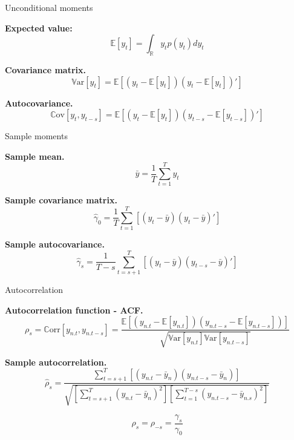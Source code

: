 \documentclass[notes,blackandwhite,mathsans]{beamer}
\begin{document}
\begin{frame}{Unconditional moments}


\textbf{Expected value:}
$$ \mathbb{E}[y_{t}] = \int_{\mathbb{R}}y_tp(y_t)dy_t $$


\textbf{Covariance matrix.}
$$ \mathbb{V}\text{ar}[y_{t}] = \mathbb{E}\left[\left(y_{t} - \mathbb{E}[y_{t}]\right)\left(y_{t} - \mathbb{E}[y_{t}]\right)'\right] $$


\textbf{Autocovariance.}
$$ \mathbb{C}\text{ov}[y_{t}, y_{t-s}] = \mathbb{E}\left[\left(y_{t} - \mathbb{E}[y_{t}]\right)\left(y_{t-s} - \mathbb{E}[y_{t-s}]\right)'\right] $$

\end{frame}





\begin{frame}{Sample moments}

\textbf{Sample mean.}
$$ \bar{y} = \frac{1}{T}\sum_{t=1}^{T}y_t $$


\textbf{Sample covariance matrix.}\\
$$ \hat{\gamma}_0 = \frac{1}{T}\sum_{t=1}^{T}\left[(y_{t} - \bar{y})(y_{t} - \bar{y})'\right] $$


\textbf{Sample autocovariance.}
$$ \hat{\gamma}_s = \frac{1}{T-s}\sum_{t=s+1}^{T}\left[(y_{t} - \bar{y})(y_{t-s} - \bar{y})'\right] $$

\end{frame}


\begin{frame}{Autocorrelation }


\textbf{Autocorrelation function - ACF.}
$$ \rho_s = \mathbb{C}\text{orr}[y_{n.t}, y_{n.t-s}] = \frac{\mathbb{E}\left[\left(y_{n.t} - \mathbb{E}[y_{n.t}]\right)\left(y_{n.t-s} - \mathbb{E}[y_{n.t-s}]\right)\right]}{\sqrt{ \mathbb{V}\text{ar}[y_{n.t}] \mathbb{V}\text{ar}[y_{n.t-s}] } }  $$

\bigskip\textbf{Sample autocorrelation.}
$$ \hat{\rho}_s = \frac{\sum_{t=s+1}^{T}[(y_{n.t} - \bar{y}_n)(y_{n.t-s} - \bar{y}_n)]}{\sqrt{\left[\sum_{t=s+1}^{T}(y_{n.t} - \bar{y}_n)^2 \right]\left[\sum_{t=1}^{T-s}(y_{n.t-s} - \bar{y}_{n.s})^2 \right]}} $$


$$\rho_s = \rho_{-s} = \frac{\gamma_s}{\gamma_0} $$


\end{frame}
\end{document}
